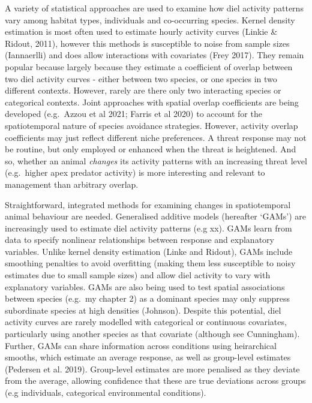 \documentclass[]{elsarticle} %
\begin{document}
A variety of statistical approaches are used to examine how diel activity patterns vary among habitat types, individuals and co-occurring species. Kernel density estimation is most often used to estimate hourly activity curves (Linkie \& Ridout, 2011), however this methods is susceptible to noise from sample sizes (Iannaerlli) and does allow interactions with covariates (Frey 2017). They remain popular because largely because they estimate a coefficient of overlap between two diel activity curves - either between two species, or one species in two different contexts. However, rarely are there only two interacting species or categorical contexts. Joint approaches with spatial overlap coefficients are being developed (e.g.~Azzou et al 2021; Farris et al 2020) to account for the spatiotemporal nature of species avoidance strategies. However, activity overlap coefficients may just reflect different niche preferences. A threat response may not be routine, but only employed or enhanced when the threat is heightened. And so, whether an animal \emph{changes} its activity patterns with an increasing threat level (e.g.~higher apex predator activity) is more interesting and relevant to management than arbitrary overlap.

Straightforward, integrated methods for examining changes in spatiotemporal animal behaviour are needed. Generalised additive models (hereafter `GAMs') are increasingly used to estimate diel activity patterns (e.g xx). GAMs learn from data to specify nonlinear relationships between response and explanatory variables. Unlike kernel density estimation (Linke and Ridout), GAMs include smoothing penalties to avoid overfitting (making them less susceptible to noisy estimates due to small sample sizes) and allow diel activity to vary with explanatory variables. GAMs are also being used to test spatial associations between species (e.g.~my chapter 2) as a dominant species may only suppress subordinate species at high densities (Johnson). Despite this potential, diel activity curves are rarely modelled with categorical or continuous covariates, particularly using another species as that covariate (although see Cunningham). Further, GAMs can share information across conditions using heirarchical smooths, which estimate an average response, as well as group-level estimates (Pedersen et al. 2019). Group-level estimates are more penalised as they deviate from the average, allowing confidence that these are true deviations across groups (e.g individuals, categorical environmental conditions).
\end{document}
